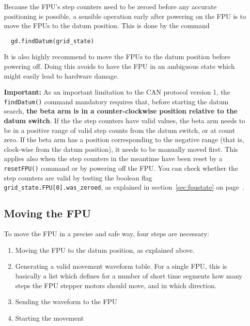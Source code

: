 \documentclass{scrartcl}[12pt,a4paper]
\begin{document}
Because the FPU's step counters need to be zeroed
before any accurate positioning is possible, a
sensible operation early after powering on
the FPU is to move the FPUs to the datum position.
This is done by the command

\begin{verbatim}
  gd.findDatum(grid_state)
\end{verbatim}

It is also highly recommend to move the FPUs to the datum position
before powering off. Doing this avoids to have the FPU in an ambiguous
state which might easily lead to hardware damage.

\textbf{Important:} As an important limitation to the CAN protocol
version 1, the \texttt{findDatum()} command mandatory requires that,
before starting the datum search, \textbf{the beta arm is in a
  counter-clockwise position relative to the datum switch}. If the the
step counters have valid values, the beta arm needs to be in a
positive range of valid step counts from the datum switch, or at count
zero. If the beta arm has a position corresponding to the negative
range (that is, clock-wise from the datum position), it needs to be
manually moved first.  This applies also when the step counters in the
meantime have been reset by a \texttt{resetFPU()} command or by
powering off the FPU. You can check whether the step counters are
valid by testing the boolean flag \verb+grid_state.FPU[0].was_zeroed+,
as explained in section~\ref{sec:fpustate} on
page~\pageref{sec:fpustate}.


\subsection{Moving the FPU}

To move the FPU in a precise and safe way, four steps are necessary:

\begin{enumerate}
\item Moving the FPU to the datum position, as explained above.

\item Generating a valid movement waveform table. For a single FPU,
  this is basically a list which defines for a number of short time
  segments how many steps the FPU stepper motors should move, and in
  which direction.

\item Sending the waveform to the FPU
\item Starting the movement
  
\end{enumerate}
\end{document}
